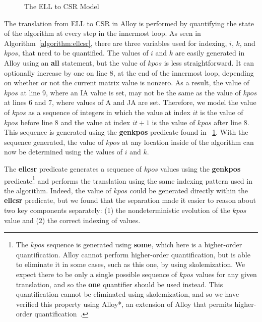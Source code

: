 \documentclass[sigconf]{acmart}
\begin{document}
\begin{figure}

\caption{The ELL to CSR Model}
\label{alloy:csrell}
\end{figure}

The translation from ELL to CSR in Alloy is performed by quantifying the state of the algorithm at every step in the innermost loop.  As seen in Algorithm~\ref{algorithm:ellcsr}, there are three variables used for indexing, $i$, $k$, and $kpos$, that need to be quantified.  The values of $i$ and $k$ are easily generated in Alloy using an \textbf{all} statement, but the value of $kpos$ is less straightforward.
It can optionally increase by one on line 8, at the end of the innermost loop, depending on whether or not the current matrix value is nonzero.
As a result, the value of $kpos$ at line 9, where an IA value is set, may not be the same as the value of $kpos$ at lines 6 and 7, where values of A and JA are set.
Therefore, we model the value of $kpos$ as a sequence of integers in which the value at index $it$ is the value of $kpos$ before line 8 and the value at index $it+1$ is the value of $kpos$ after line 8.
This sequence is generated using the \textbf{genkpos} predicate found in \figurename~\ref{alloy:csrell}.  With the sequence generated, the value of $kpos$ at any location inside of the algorithm can now be determined using the values of $i$ and $k$.

The \textbf{ellcsr} predicate generates a sequence of $kpos$ values using the \textbf{genkpos} predicate\footnote{The $kpos$ sequence is generated using \textbf{some}, which here is a higher-order quantification.  Alloy cannot perform higher-order quantification, but is able to eliminate it in some cases, such as this one, by using skolemization.  We expect there to be only a single possible sequence of $kpos$ values for any given translation, and so the \textbf{one} quantifier should be used instead.  This quantification cannot be eliminated using skolemization, and so we have verified this property using Alloy*, an extension of Alloy that permits higher-order quantification~\cite{alloy*}.} and performs the translation using the same indexing pattern used in the algorithm.  Indeed, the value of $kpos$ could be generated directly within the \textbf{ellcsr} predicate, but we found that the separation made it easier to reason about two key components separately: (1) the nondeterministic evolution of the $kpos$ value and (2) the correct indexing of values.
\end{document}
